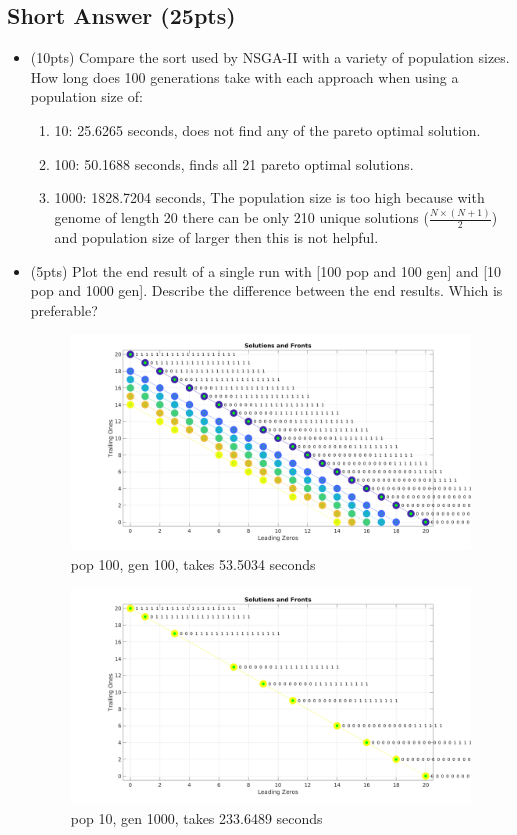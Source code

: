 \documentclass{article}
\begin{document}
\newpage
\subsection{Short Answer (25pts)}
\begin{itemize}
	\item (10pts) Compare the sort used by NSGA-II with a variety of population sizes. How long does 100 generations take with each approach when using a population size of:
	\begin{enumerate}
		\item 10: {\color{blue}25.6265 seconds, does not find any of the pareto optimal solution.}
		\item 100: {\color{blue}50.1688 seconds, finds all 21 pareto optimal solutions.}
		\item 1000: {\color{blue} 1828.7204 seconds, The population size is too high because with genome of length 20 there can be only 210 unique solutions ($\frac{N \times (N+1)}{2}$) and population size of larger then this is not helpful.}
	\end{enumerate}
	
	
	\item (5pts) Plot the end result of a single run with [100 pop and 100 gen] and [10 pop and 1000 gen]. Describe the difference between the end results. Which is preferable? \\

	\begin{figure}[h]
		\centering
		\includegraphics[width=0.7\linewidth]{img/p_100_g_100}
		\caption{pop 100, gen 100, takes 53.5034 seconds}
		\label{fig:p_100_g_100}
	\end{figure}
	
	\begin{figure}[h]
		\centering
		\includegraphics[width=0.7\linewidth]{img/p_10_g_1000}
		\caption{pop 10, gen 1000, takes 233.6489 seconds}
		\label{fig:p_10_g_1000}
	\end{figure}
	


\end{itemize}
\end{document}
